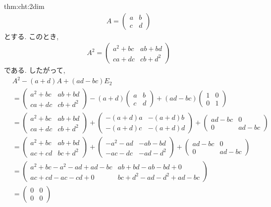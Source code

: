 \begin{proofof}{thm:cht:2dim}
  \begin{align*}
    A=
    \begin{pmatrix}
      a&b\\c&d
    \end{pmatrix}
  \end{align*}
  とする.
  このとき,
  \begin{align*}
    A^2=
    \begin{pmatrix}
      a^2+bc&ab+bd\\ca+dc&cb+d^2
    \end{pmatrix}
  \end{align*}
  である. したがって,
  \begin{align*}
    &A^2-(a+d)A+(ad-bc)E_2\\
    &=
    \begin{pmatrix}
      a^2+bc&ab+bd\\ca+dc&cb+d^2
    \end{pmatrix}
    -(a+d)
    \begin{pmatrix}
      a&b\\c&d
    \end{pmatrix}
    +(ad-bc)
    \begin{pmatrix}
      1&0\\0&1
    \end{pmatrix}\\
    &=
    \begin{pmatrix}
      a^2+bc&ab+bd\\ca+dc&cb+d^2
    \end{pmatrix}
    +
    \begin{pmatrix}
      -(a+d)a&-(a+d)b\\-(a+d)c&-(a+d)d
    \end{pmatrix}
    +
    \begin{pmatrix}
      ad-bc&0\\0&ad-bc
    \end{pmatrix}\\
    &=
    \begin{pmatrix}
      a^2+bc&ab+bd\\ac+cd&bc+d^2
    \end{pmatrix}
    +
    \begin{pmatrix}
      -a^2-ad&-ab-bd\\-ac-dc&-ad-d^2
    \end{pmatrix}
    +
    \begin{pmatrix}
      ad-bc&0\\0&ad-bc
    \end{pmatrix}\\
    &=
    \begin{pmatrix}
      a^2+bc-a^2-ad+ad-bc&ab+bd-ab-bd+0\\ac+cd-ac-cd+0&bc+d^2-ad-d^2+ad-bc
    \end{pmatrix}\\
    &=
    \begin{pmatrix}
      0&0\\0&0
    \end{pmatrix}\\
  \end{align*}
\end{proofof}


